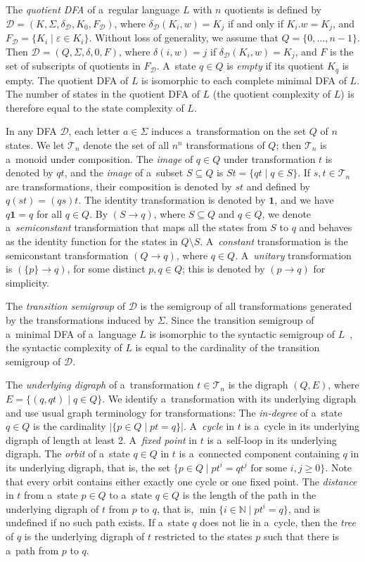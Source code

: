 \documentclass{amsart}
\renewcommand{\ge}{\geqslant}
\newcommand{\eps}{\varepsilon}
\newcommand{\cD}{{\mathcal D}}
\newcommand{\cT}{{\mathcal T}}
\begin{document}
The \emph{quotient DFA} of a~regular language $L$ with $n$ quotients is defined by
$\cD=(K, \Sigma, \delta_\cD, K_0,F_\cD)$, where $\delta_\cD(K_i,w)=K_j$ if and only if $K_i.w=K_j$, and $F_\cD=\{K_i\mid \eps \in K_i\}$.
Without loss of generality, we assume that $Q=\{0,\dots,n-1\}$.
Then $\cD=(Q, \Sigma, \delta, 0,F)$, where $\delta(i,w)=j$ if $\delta_\cD(K_i,w)=K_j$, and $F$ is the set of subscripts of quotients in $F_\cD$.
A~state $q \in Q$ is \emph{empty} if its quotient $K_q$ is empty.
The quotient DFA of $L$ is isomorphic to each complete minimal DFA of $L$.
The number of states in the quotient DFA of $L$ (the quotient complexity of $L$) is therefore equal to the state complexity of $L$.

In any DFA $\cD$, each letter $a\in \Sigma$ induces a~transformation on the set $Q$ of $n$ states.
We let $\cT_n$ denote the set of all $n^n$ transformations of $Q$; then $\cT_n$ is a~monoid under composition. 
The \emph{image} of $q\in Q$ under transformation $t$ is denoted by $qt$, and the \emph{image} of a~subset $S \subseteq Q$ is $St = \{qt \mid q \in S\}$.
If $s,t \in \cT_n$ are transformations, their composition is denoted by $st$ and defined by $q(st)=(qs)t$.
The identity transformation is denoted by $\mathbf{1}$, and we have $q\mathbf{1} = q$ for all $q \in Q$.
By $(S \to q)$, where $S \subseteq Q$ and $q \in Q$, we denote a~\emph{semiconstant} transformation that maps all the
states from $S$ to $q$ and behaves as the identity function for the states in $Q \setminus S$.
A~\emph{constant} transformation is the semiconstant transformation $(Q \to q)$, where $q \in Q$.
A~\emph{unitary} transformation is $(\{p\} \to q)$, for some distinct $p,q \in Q$; this is denoted by $(p \to q)$ for simplicity.

The \emph{transition semigroup} of $\cD$ is the semigroup of all transformations generated by the transformations induced by $\Sigma$.
Since the transition semigroup of a~minimal DFA of a~language $L$ is isomorphic to the syntactic semigroup of $L$~\cite{Pin97}, the syntactic complexity of $L$ is equal to the cardinality of the transition semigroup of $\cD$.

The \emph{underlying digraph} of a~transformation $t \in \cT_n$ is the digraph $(Q,E)$, where $E = \{(q,qt) \mid q \in Q\}$.
We identify a~transformation with its underlying digraph and use usual graph terminology for transformations:
The \emph{in-degree} of a~state $q \in Q$ is the cardinality $|\{p \in Q \mid pt = q\}|$.
A~\emph{cycle} in $t$ is a~cycle in its underlying digraph of length at least 2.
A~\emph{fixed point} in $t$ is a~self-loop in its underlying digraph.
The \emph{orbit} of a~state $q \in Q$ in $t$ is a~connected component containing $q$ in its underlying digraph, that is, the set $\{p \in Q \mid pt^i = qt^j\text{ for some }i,j \ge 0\}$.
Note that every orbit contains either exactly one cycle or one fixed point.
The \emph{distance} in $t$ from a~state $p \in Q$ to a~state $q \in Q$ is the length of the path in the underlying digraph of $t$ from $p$ to $q$, that is, $\min\{i \in \mathbb{N} \mid pt^i = q\}$, and is undefined if no such path exists.
If a~state $q$ does not lie in a~cycle, then the \emph{tree} of $q$ is the underlying digraph of $t$ restricted to the states $p$ such that there is a~path from $p$ to $q$.
\end{document}
